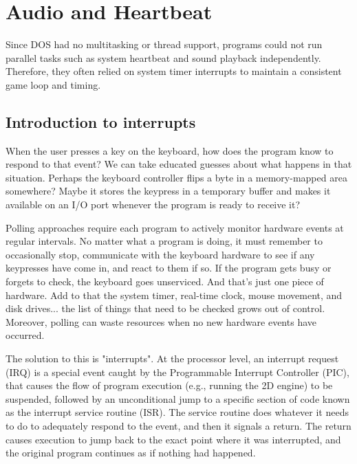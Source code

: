 \documentclass[book.tex]{subfiles}
\begin{document}
\section{Audio and Heartbeat} 
\label{audio_and_heartbeat}
Since DOS had no multitasking or thread support, programs could not run parallel tasks such as system heartbeat and sound playback independently. Therefore, they often relied on system timer interrupts to maintain a consistent game loop and timing.\\

\subsection{Introduction to interrupts}
When the user presses a key on the keyboard, how does the program know to respond to that event? We can take educated guesses about what happens in that situation. Perhaps the keyboard controller flips a byte in a memory-mapped area somewhere? Maybe it stores the keypress in a temporary buffer and makes it available on an I/O port whenever the program is ready to receive it?\\

\par
Polling approaches require each program to actively monitor hardware events at regular intervals. No matter what a program is doing, it must remember to occasionally stop, communicate with the keyboard hardware to see if any keypresses have come in, and react to them if so. If the program gets busy or forgets to check, the keyboard goes unserviced. And that's just one piece of hardware. Add to that the system timer, real-time clock, mouse movement, and disk drives... the list of things that need to be checked grows out of control. Moreover, polling can waste resources when no new hardware events have occurred.\\

\par
The solution to this is "interrupts". At the processor level, an interrupt request (IRQ) is a special event caught by the Programmable Interrupt Controller (PIC), that causes the flow of program execution (e.g., running the 2D engine) to be suspended, followed by an unconditional jump to a specific section of code known as the interrupt service routine (ISR). The service routine does whatever it needs to do to adequately respond to the event, and then it signals a return. The return causes execution to jump back to the exact point where it was interrupted, and the original program continues as if nothing had happened. \\
\end{document}
